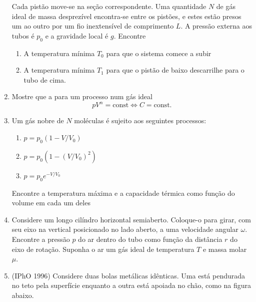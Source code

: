 \documentclass[a4paper, 12pt]{article}
\theoremstyle{definition}
\theoremstyle{definition}
\begin{document}
\begin{enumerate}
    Cada pistão move-se na seção correspondente. Uma quantidade $N$ de gás ideal de massa desprezível
    encontra-se entre os pistões, e estes estão presos um ao outro por um fio inextensível de comprimento $L$.
    A pressão externa aos tubos é $p_0$ e a gravidade local é $g$. Encontre
    \begin{enumerate}
        \item A temperatura mínima $T_0$ para que o sistema comece a subir
        \item A temperatura mínima $T_1$ para que o pistão de baixo descarrilhe para o tubo de cima.
    \end{enumerate}
    \item Mostre que a para um processo num gás ideal
    $$pV^\alpha=\text{const}\Leftrightarrow C=\text{const}.$$
    \item Um gás nobre de $N$ moléculas é sujeito aos seguintes processos:
    \begin{enumerate}
        \item $p=p_0(1-V/V_0)$
        \item $p=p_0(1-(V/V_0)^2)$
        \item $p=p_0e^{-V/V_0}$
    \end{enumerate}
    Encontre a temperatura máxima e a capacidade térmica como função do volume em cada um deles
    \item Considere um longo cilíndro horizontal semiaberto. Coloque-o para girar, com seu eixo na vertical 
    posicionado no lado aberto, a uma velocidade angular $\omega$. Encontre a pressão $p$ do ar dentro do tubo
    como função da distância $r$ do eixo de rotação. Suponha o ar um gás ideal de temperatura $T$ e massa molar
    $\mu$.
    \item (IPhO 1996) Considere duas bolas metálicas idênticas. Uma está pendurada no teto pela superfície
    enquanto a outra está apoiada no chão, como na figura abaixo.
    \begin{figure}[h]
        \centering
    \end{figure}


\end{enumerate}
\end{document}

